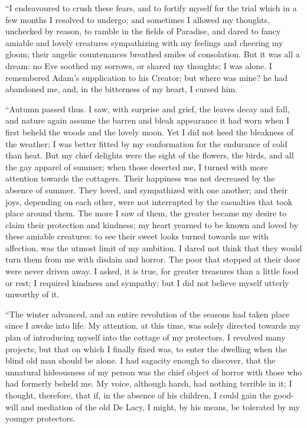 ``I endeavoured to crush these fears,
and to fortify myself for the trial which
in a few months I resolved to undergo;
and sometimes I allowed my thoughts,
unchecked by reason, to ramble in the
fields of Paradise, and dared to fancy
amiable and lovely creatures
sympathizing with my feelings and cheering
my gloom; their angelic countenances
breathed smiles of consolation. But it
was all a dream: no Eve soothed my
sorrows, or shared my thoughts; I was
alone. I remembered Adam's supplication
to his Creator; but where was mine?
he had abandoned me, and, in the bitterness
of my heart, I cursed him.

``Autumn passed thus. I saw, with
surprise and grief, the leaves decay and
fall, and nature again assume the barren
and bleak appearance it had worn
when I first beheld the woods and the
lovely moon. Yet I did not heed the
bleakness of the weather; I was better
fitted by my conformation for the endurance
of cold than heat. But my chief
delights were the sight of the flowers,
the birds, and all the gay apparel of
summer; when those deserted me, I
turned with more attention towards the
cottagers. Their happiness was not
decreased by the absence of summer.
They loved, and sympathized with one
another; and their joys, depending on
each other, were not interrupted by
the casualties that took place around
them. The more I saw of them, the
greater became my desire to claim their
protection and kindness; my heart
yearned to be known and loved by
these amiable creatures: to see their
sweet looks turned towards me with
affection, was the utmost limit of my
ambition. I dared not think that they
would turn them from me with disdain
and horror. The poor that stopped at
their door were never driven away. I
asked, it is true, for greater treasures
than a little food or rest; I required
kindness and sympathy; but I did not
believe myself utterly unworthy of it.

``The winter advanced, and an entire
revolution of the seasons had taken
place since I awoke into life. My attention,
at this time, was solely directed
towards my plan of introducing myself
into the cottage of my protectors. I revolved
many projects; but that on
which I finally fixed was, to enter the
dwelling when the blind old man should
be alone. I had sagacity enough to
discover, that the unnatural hideousness
of my person was the chief object
of horror with those who had formerly
beheld me. My voice, although harsh,
had nothing terrible in it; I thought,
therefore, that if, in the absence of his
children, I could gain the good-will and
mediation of the old De Lacy, I might,
by his means, be tolerated by my
younger protectors.

